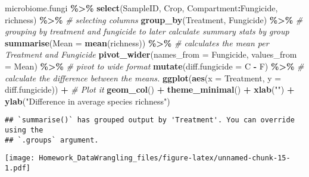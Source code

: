 \documentclass[
]{article}
\newenvironment{Shaded}{\begin{snugshade}}{\end{snugshade}}
\newcommand{\AttributeTok}[1]{\textcolor[rgb]{0.13,0.29,0.53}{#1}}
\newcommand{\CommentTok}[1]{\textcolor[rgb]{0.56,0.35,0.01}{\textit{#1}}}
\newcommand{\FunctionTok}[1]{\textcolor[rgb]{0.13,0.29,0.53}{\textbf{#1}}}
\newcommand{\NormalTok}[1]{#1}
\newcommand{\SpecialCharTok}[1]{\textcolor[rgb]{0.81,0.36,0.00}{\textbf{#1}}}
\newcommand{\StringTok}[1]{\textcolor[rgb]{0.31,0.60,0.02}{#1}}
\begin{document}
\begin{Shaded}
\begin{Highlighting}[]
\NormalTok{microbiome.fungi }\SpecialCharTok{\%\textgreater{}\%}
  \FunctionTok{select}\NormalTok{(SampleID, Crop, Compartment}\SpecialCharTok{:}\NormalTok{Fungicide, richness) }\SpecialCharTok{\%\textgreater{}\%} \CommentTok{\# selecting columns  }
  \FunctionTok{group\_by}\NormalTok{(Treatment, Fungicide) }\SpecialCharTok{\%\textgreater{}\%} \CommentTok{\# grouping by treatment and fungicide to later calculate summary stats by group}
  \FunctionTok{summarise}\NormalTok{(}\AttributeTok{Mean =} \FunctionTok{mean}\NormalTok{(richness)) }\SpecialCharTok{\%\textgreater{}\%} \CommentTok{\# calculates the mean per Treatment and Fungicide }
  \FunctionTok{pivot\_wider}\NormalTok{(}\AttributeTok{names\_from =}\NormalTok{ Fungicide, }\AttributeTok{values\_from =}\NormalTok{ Mean) }\SpecialCharTok{\%\textgreater{}\%} \CommentTok{\# pivot to wide format}
  \FunctionTok{mutate}\NormalTok{(}\AttributeTok{diff.fungicide =}\NormalTok{ C }\SpecialCharTok{{-}}\NormalTok{ F) }\SpecialCharTok{\%\textgreater{}\%}  \CommentTok{\# calculate the difference between the means. }
  \FunctionTok{ggplot}\NormalTok{(}\FunctionTok{aes}\NormalTok{(}\AttributeTok{x =}\NormalTok{ Treatment, }\AttributeTok{y =}\NormalTok{ diff.fungicide)) }\SpecialCharTok{+} \CommentTok{\# Plot it }
  \FunctionTok{geom\_col}\NormalTok{() }\SpecialCharTok{+}
  \FunctionTok{theme\_minimal}\NormalTok{() }\SpecialCharTok{+}
  \FunctionTok{xlab}\NormalTok{(}\StringTok{""}\NormalTok{) }\SpecialCharTok{+}
  \FunctionTok{ylab}\NormalTok{(}\StringTok{"Difference in average species richness"}\NormalTok{)}
\end{Highlighting}
\end{Shaded}

\begin{verbatim}
## `summarise()` has grouped output by 'Treatment'. You can override using the
## `.groups` argument.
\end{verbatim}

\texttt{[image: Homework\_DataWrangling\_files/figure-latex/unnamed-chunk-15-1.pdf]}
\end{document}
